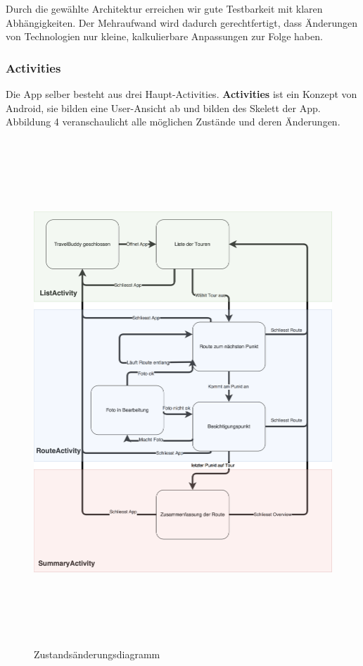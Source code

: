 \documentclass[a4paper,10pt,xetex]{article}
\begin{document}
Durch die gewählte Architektur erreichen wir gute Testbarkeit mit klaren
Abhängigkeiten. Der Mehraufwand wird dadurch gerechtfertigt, dass Änderungen
von Technologien nur kleine, kalkulierbare Anpassungen zur Folge haben.

\newpage
\subsubsection{Activities}\label{activities}
Die App selber besteht aus drei Haupt-Activities. \textbf{Activities} ist ein
Konzept von Android, sie bilden eine User-Ansicht ab und bilden des Skelett
der App. Abbildung 4 veranschaulicht alle möglichen Zustände und deren
Änderungen.
\begin{figure}
  \centering
  \includegraphics[height=19cm]{state-diagram}
  \caption{Zustandsänderungsdiagramm}
\end{figure}
\end{document}
